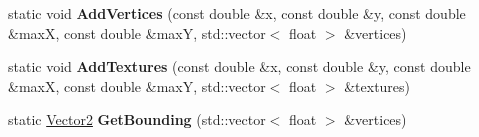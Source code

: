 \begin{DoxyCompactItemize}
static void {\bfseries Add\+Vertices} (const double \&x, const double \&y, const double \&maxX, const double \&maxY, std\+::vector$<$ float $>$ \&vertices)
\item 
\mbox{\label{class_flounder_1_1_text_a2f07013e6d131777b634ea16485977c7}} 
static void {\bfseries Add\+Textures} (const double \&x, const double \&y, const double \&maxX, const double \&maxY, std\+::vector$<$ float $>$ \&textures)
\item 
\mbox{\label{class_flounder_1_1_text_ab07a28beb720a2aa90753939b8ac5a0c}} 
static \hyperlink{class_flounder_1_1_vector2}{Vector2} {\bfseries Get\+Bounding} (std\+::vector$<$ float $>$ \&vertices)
\end{DoxyCompactItemize}
